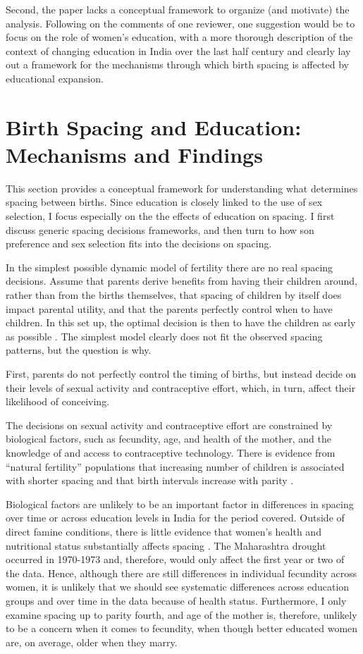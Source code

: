 Second, the paper lacks a conceptual framework to organize (and
motivate) the analysis. Following on the comments of one reviewer, one
suggestion would be to focus on the role of women’s education, with a
more thorough description of the context of changing education in India
over the last half century and clearly lay out a framework for the
mechanisms through which birth spacing is affected by educational
expansion.

\section{Birth Spacing and Education: Mechanisms and Findings}

This section provides a conceptual framework for understanding what determines spacing 
between births.
Since education is closely linked to the use of sex selection, I focus especially on the
the effects of education on spacing.
I first discuss generic spacing decisions frameworks, and then turn to how son preference
and sex selection fits into the decisions on spacing.

In the simplest possible dynamic model of fertility there are no real spacing decisions.
Assume that parents derive benefits from having their children around, rather than from 
the births themselves, that spacing of children by itself does impact parental utility, 
and that the parents perfectly control when to have children. 
In this set up, the optimal decision is then to have the children as early as possible 
\citep{Newman1988}.
The simplest model clearly does not fit the observed spacing patterns, but the question 
is why.

First, parents do not perfectly control the timing of births, but instead decide on their
levels of sexual activity and contraceptive effort, which, in turn, affect their likelihood 
of conceiving.

The decisions on sexual activity and contraceptive effort are constrained by biological 
factors, such as fecundity, age, and health of the mother, and the knowledge of and access
to contraceptive technology.
There is evidence from ``natural fertility'' populations that increasing number of 
children is associated with shorter spacing and that birth intervals increase 
with parity \citep{Henry1961,Leridon1977}.

Biological factors are unlikely to be an important factor in differences in spacing over 
time or across education levels in India for the period covered.
Outside of direct famine conditions, there is little evidence that women's health and 
nutritional status substantially affects spacing \citep{Huffman1987,John1987,lindstrom99}.
The Maharashtra drought occurred in 1970-1973 and, therefore, would only affect the first
year or two of the data.
Hence, although there are still differences in individual fecundity across women, it is
unlikely that we should see systematic differences across education groups and over time
in the data because of health status.
Furthermore, I only examine spacing up to parity fourth, and age of the mother is,
therefore, unlikely to be a concern when it comes to fecundity, when though better 
educated women are, on average, older when they marry. 

